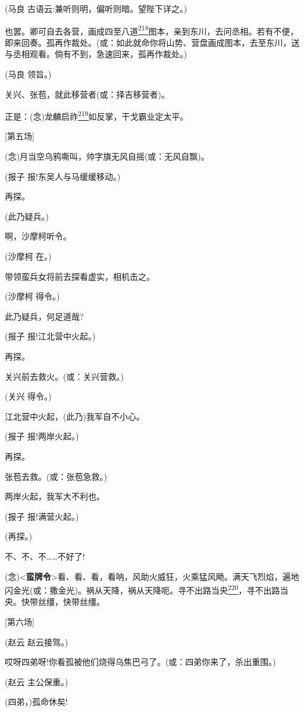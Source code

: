 (马良 古语云:兼听则明，偏听则暗。望陛下详之。)

也罢。卿可自去各营，画成四至八道\protect\hyperlink{fn218}{\textsuperscript{218}}图本，亲到东川，去问丞相。若有不便，即来回奏。孤再作裁处。(或：如此就命你将山势、营盘画成图本，去至东川，送与丞相观看。倘有不到，急速回来，孤再作裁处。)

(马良 领旨。)

关兴、张苞，就此移营者(或：择吉移营者)。

正是：(念)龙麟启祚\protect\hyperlink{fn219}{\textsuperscript{219}}如反掌，干戈霸业定太平。

{[}第五场{]}

(念)月当空乌鸦嘶叫，帅字旗无风自摇(或：无风自飘)。

(报子 报!东吴人与马缓缓移动。)

再探。

(此乃疑兵。)

啊，沙摩柯听令。

(沙摩柯 在。)

带领蛮兵女将前去探看虚实，相机击之。

(沙摩柯 得令。)

此乃疑兵，何足道哉?

(报子 报!江北营中火起。)

再探。

关兴前去救火。(或：关兴营救。)

(关兴 得令。)

江北营中火起，(此乃)我军自不小心。

(报子 报!两岸火起。)

再探。

张苞去救。(或：张苞急救。)

两岸火起，我军大不利也。

(报子 报!满营火起。)

(再探。)

不、不、不\ldots{}\ldots{}不好了!

(念)\textless{}\textbf{蛮牌令}\textgreater{}看、看、看，看呐，风助火威狂，火乘猛风飏。满天飞烈焰，遍地闪金光(或：撒金光)。祸从天降，祸从天降呃。寻不出路当央\protect\hyperlink{fn220}{\textsuperscript{220}}，寻不出路当央。快带丝缰，快带丝缰。

{[}第六场{]}

(赵云 赵云接驾。)

哎呀四弟呀!你看孤被他们烧得乌焦巴弓了。(或：四弟你来了，杀出重围。)

(赵云 主公保重。)

(四弟，)孤命休矣!

